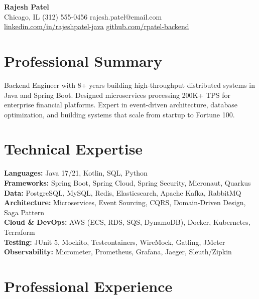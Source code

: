 \documentclass[10pt,a4paper]{article}
\begin{document}
\begin{center}
{\fontsize{20}{24}\selectfont\bfseries\color{accent}Rajesh Patel}\\[5pt]
{\small Chicago, IL \quad\textbar\quad (312) 555-0456 \quad\textbar\quad rajesh.patel@email.com}\\[2pt]
{\small \href{https://linkedin.com/in/rajeshpatel-java}{linkedin.com/in/rajeshpatel-java} \quad\textbar\quad \href{https://github.com/rpatel-backend}{github.com/rpatel-backend}}
\end{center}

\section{Professional Summary}
Backend Engineer with 8+ years building high-throughput distributed systems in Java and Spring Boot. Designed microservices processing 200K+ TPS for enterprise financial platforms. Expert in event-driven architecture, database optimization, and building systems that scale from startup to Fortune 100.

\section{Technical Expertise}
\textbf{Languages:} Java 17/21, Kotlin, SQL, Python\\
\textbf{Frameworks:} Spring Boot, Spring Cloud, Spring Security, Micronaut, Quarkus\\
\textbf{Data:} PostgreSQL, MySQL, Redis, Elasticsearch, Apache Kafka, RabbitMQ\\
\textbf{Architecture:} Microservices, Event Sourcing, CQRS, Domain-Driven Design, Saga Pattern\\
\textbf{Cloud \& DevOps:} AWS (ECS, RDS, SQS, DynamoDB), Docker, Kubernetes, Terraform\\
\textbf{Testing:} JUnit 5, Mockito, Testcontainers, WireMock, Gatling, JMeter\\
\textbf{Observability:} Micrometer, Prometheus, Grafana, Jaeger, Sleuth/Zipkin

\section{Professional Experience}
\end{document}
